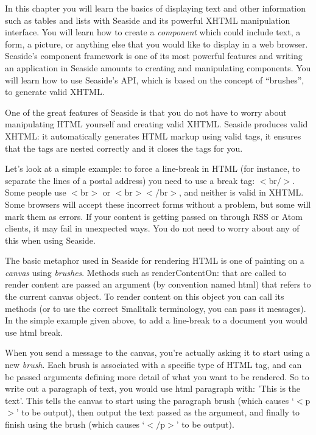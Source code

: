 \documentclass[a4paper,10pt,twoside]{book}
\newcommand{\ct}[1]{{\small\ttfamily\textup{#1}}}
\begin{document}
In this chapter you will learn the basics of displaying text and other information such as tables and lists with Seaside and its powerful XHTML manipulation interface. You will learn how to create a \textit{component} which could include text, a form, a picture, or anything else that you would like to display in a web browser. Seaside's component framework is one of its most powerful features and writing an application in Seaside amounts to creating and manipulating components. You will learn how to use Seaside's API, which is based on the concept of ``brushes'', to generate valid XHTML.

One of the great features of Seaside is that you do not have to worry about manipulating HTML yourself and creating valid XHTML.  Seaside produces valid XHTML: it automatically generates HTML markup using valid tags, it ensures that the tags are nested correctly and it closes the tags for you.  

Let's look at a simple example: to force a line-break in HTML (for instance, to separate the lines of a postal address) you need to use a break tag: \ct{$<$br$/$$>$}. Some people use \ct{$<$br$>$} or \ct{$<$br$>$$<$$/$br$>$}, and neither is valid in XHTML. Some browsers will accept these incorrect forms without a problem, but some will mark them as errors. If your content is getting passed on through RSS or Atom clients, it may fail in unexpected ways. You do not need to worry about any of this when using Seaside.

The basic metaphor used in Seaside for rendering HTML is one of painting on a \textit{canvas} using \textit{brushes}. Methods such as \ct{renderContentOn:} that are called to render content are passed an argument (by convention named \ct{html}) that refers to the current canvas object. To render content on this object you can call its methods (or to use the correct Smalltalk terminology, you can pass it messages). In the simple example given above, to add a line-break to a document you would use \ct{html break}. 

When you send a message to the canvas, you're actually asking it to start using a new \textit{brush}. Each brush is associated with a specific type of HTML tag, and can be passed arguments defining more detail of what you want to be rendered. So to write out a paragraph of text, you would use \ct{html paragraph with: 'This is the text'}. This tells the canvas to start using the paragraph brush (which causes `\ct{$<$p$>$}' to be output), then output the text passed as the argument, and finally to finish using the brush (which causes `\ct{$<$$/$p$>$}' to be output).
\end{document}
